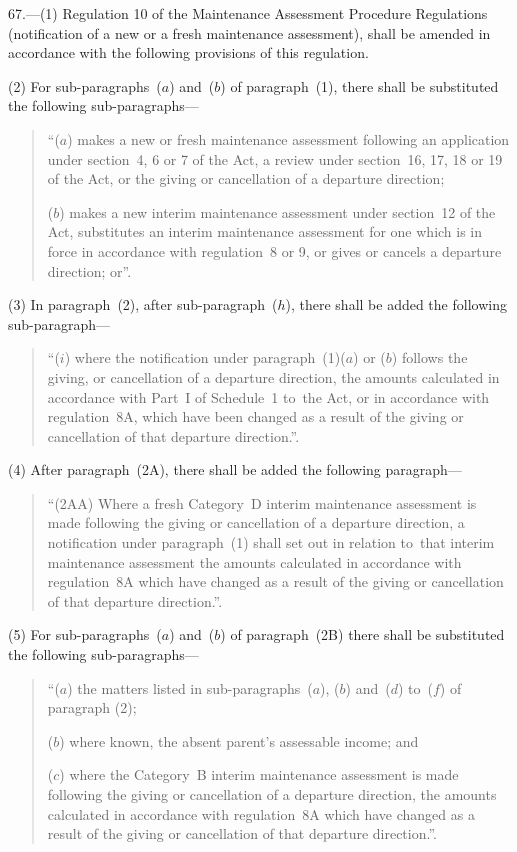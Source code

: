 \documentclass[12pt,a4paper]{article}
\begin{document}
67.—(1) Regulation 10 of the Maintenance Assessment Procedure
Regulations (notification of a new or a fresh maintenance assessment), shall be
amended in accordance with the following provisions of this regulation.

(2) For sub-paragraphs~($a$) and~($b$) of paragraph~(1), there shall be substituted
the following sub-paragraphs—
\begin{quotation}
“($a$) makes a new or fresh maintenance assessment following an application under
section~4, 6 or 7 of the Act, a review under section~16, 17, 18 or 19 of the
Act, or the giving or cancellation of a departure direction;

($b$) makes a new interim maintenance assessment under section~12 of the Act,
substitutes an interim maintenance assessment for one which is in force in
accordance with regulation~8 or 9, or gives or cancels a departure direction;
or”.
\end{quotation}

(3) In paragraph~(2), after sub-paragraph~($h$), there shall be added the
following sub-paragraph—
\begin{quotation}
“($i$) where the notification under paragraph~(1)($a$) or ($b$) follows the giving, or
cancellation of a departure direction, the amounts calculated in accordance with
Part~I of Schedule~1 to~the Act, or in accordance with regulation~8A, which have
been changed as a result of the giving or cancellation of that departure
direction.”.
\end{quotation}

(4) After paragraph~(2A), there shall be added the following paragraph—
\begin{quotation}
“(2AA) Where a fresh Category~D interim maintenance assessment is made following
the giving or cancellation of a departure direction, a notification under
paragraph~(1) shall set out in relation to~that interim maintenance assessment
the amounts calculated in accordance with regulation~8A which have changed as a
result of the giving or cancellation of that departure direction.”.
\end{quotation}

(5) For sub-paragraphs~($a$) and~($b$) of paragraph~(2B) there shall be substituted
the following sub-paragraphs—
\begin{quotation}
“($a$) the matters listed in sub-paragraphs~($a$), ($b$) and~($d$) to~($f$) of paragraph
(2);

($b$) where known, the absent parent’s assessable income; and

($c$) where the Category~B interim maintenance assessment is made following the
giving or cancellation of a departure direction, the amounts calculated in
accordance with regulation~8A which have changed as a result of the giving or
cancellation of that departure direction.”.
\end{quotation}
\end{document}
